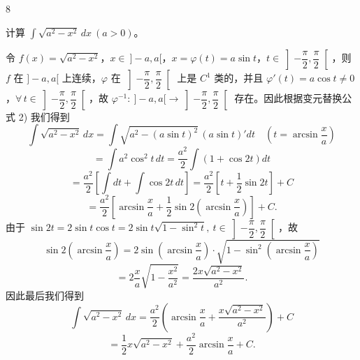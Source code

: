 \begin{sourceexample}{8}

	计算 \(\displaystyle\int\sqrt{a^2-x^2}\,dx\ (a>0)\)。

	令 \(f(x)=\sqrt{a^2-x^2}\)，\(x\in\ ]-a,a[\)，\(x=\varphi(t)=a\sin t\)，\(t\in\left]-\dfrac\pi2,\dfrac\pi2\right[\)，则 \(f\) 在 \(]-a,a[\) 上连续，\(\varphi\) 在 \(\left]-\dfrac\pi2,\dfrac\pi2\right[\) 上是 \(C^1\) 类的，并且 \(\varphi'(t)=a\cos t\neq0\)，\(\forall\,t\in\left]-\dfrac\pi2,\dfrac\pi2\right[\)，故 \(\varphi^{-1}:\ ]-a,a[\to\left]-\dfrac\pi2,\dfrac\pi2\right[\) 存在。因此根据变元替换公式 2) 我们得到
	\[
	\int\sqrt{a^2-x^2}\,dx=\int\sqrt{a^2-(a\sin t)^2}\,(a\sin t)'dt\quad\left(t=\arcsin\frac xa\right)
	\]
	\[
	=\int a^2\cos^2t\,dt=\frac{a^2}{2}\int(1+\cos2t)dt
	\]
	\[
	=\frac{a^2}{2}\left[\int dt+\int\cos2t\,dt\right]=\frac{a^2}{2}\left[t+\frac12\sin2t\right]+C
	\]
	\[
	=\frac{a^2}{2}\left[\arcsin\frac xa+\frac12\sin2\left(\arcsin\frac xa\right)\right]+C.
	\]
	由于 \(\sin2t=2\sin t\cos t=2\sin t\sqrt{1-\sin^2t},\ t\in\left]-\dfrac\pi2,\dfrac\pi2\right[\)，故
	\[
	\sin2\left(\arcsin\frac xa\right)=2\sin\left(\arcsin\frac xa\right)\cdot\sqrt{1-\sin^2\left(\arcsin\frac xa\right)}
	\]
	\[
	=2\frac xa\sqrt{1-\frac{x^2}{a^2}}=\frac{2x\sqrt{a^2-x^2}}{a^2}.
	\]
	因此最后我们得到
	\[
	\int\sqrt{a^2-x^2}\,dx=\frac{a^2}{2}\left(\arcsin\frac xa+\frac{x\sqrt{a^2-x^2}}{a^2}\right)+C
	\]
	\[
	=\frac12 x\sqrt{a^2-x^2}+\frac{a^2}{2}\arcsin\frac xa+C.
	\]

\end{sourceexample}

